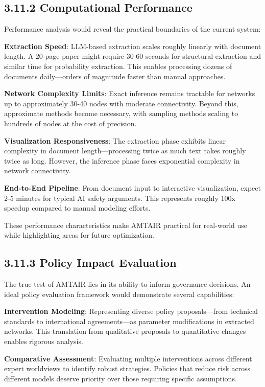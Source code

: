 \documentclass[
  11pt,
  letterpaper,
  openany]{book}
\begin{document}
\subsection{3.11.2 Computational
Performance}\label{sec-computational-performance}

Performance analysis would reveal the practical boundaries of the
current system:

\textbf{Extraction Speed}: LLM-based extraction scales roughly linearly
with document length. A 20-page paper might require 30-60 seconds for
structural extraction and similar time for probability extraction. This
enables processing dozens of documents daily---orders of magnitude
faster than manual approaches.

\textbf{Network Complexity Limits}: Exact inference remains tractable
for networks up to approximately 30-40 nodes with moderate connectivity.
Beyond this, approximate methods become necessary, with sampling methods
scaling to hundreds of nodes at the cost of precision.

\textbf{Visualization Responsiveness}: The extraction phase exhibits
linear complexity in document length---processing twice as much text
takes roughly twice as long. However, the inference phase faces
exponential complexity in network connectivity.

\textbf{End-to-End Pipeline}: From document input to interactive
visualization, expect 2-5 minutes for typical AI safety arguments. This
represents roughly 100x speedup compared to manual modeling efforts.

These performance characteristics make AMTAIR practical for real-world
use while highlighting areas for future optimization.

\subsection{3.11.3 Policy Impact Evaluation}\label{sec-policy-impact}

The true test of AMTAIR lies in its ability to inform governance
decisions. An ideal policy evaluation framework would demonstrate
several capabilities:

\textbf{Intervention Modeling}: Representing diverse policy
proposals---from technical standards to international agreements---as
parameter modifications in extracted networks. This translation from
qualitative proposals to quantitative changes enables rigorous analysis.

\textbf{Comparative Assessment}: Evaluating multiple interventions
across different expert worldviews to identify robust strategies.
Policies that reduce risk across different models deserve priority over
those requiring specific assumptions.
\end{document}
